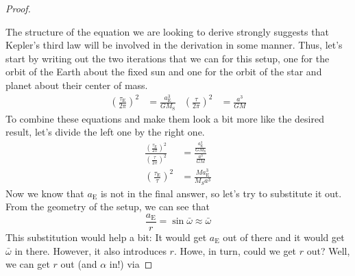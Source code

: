 \documentclass[../psets.tex]{subfiles}
\begin{document}
\begin{enumerate}
\begin{proof}
\begin{center}
        \end{center}
        The structure of the equation we are looking to derive strongly suggests that Kepler's third law will be involved in the derivation in some manner. Thus, let's start by writing out the two iterations that we can for this setup, one for the orbit of the Earth about the fixed sun and one for the orbit of the star and planet about their center of mass.
        \begin{align*}
            \left( \frac{\tau_\text{E}}{2\pi} \right)^2 &= \frac{a_\text{E}^3}{GM_\text{S}}&
            \left( \frac{\tau}{2\pi} \right)^2 &= \frac{a^3}{GM}
        \end{align*}
        To combine these equations and make them look a bit more like the desired result, let's divide the left one by the right one.
        \begin{align*}
            \frac{\left( \frac{\tau_\text{E}}{2\pi} \right)^2}{\left( \frac{\tau}{2\pi} \right)^2} &= \frac{\frac{a_\text{E}^3}{GM_\text{S}}}{\frac{a^3}{GM}}\\
            \left( \frac{\tau_\text{E}}{\tau} \right)^2 &= \frac{Ma_\text{E}^3}{M_Sa^3}
        \end{align*}
        Now we know that $a_\text{E}$ is not in the final answer, so let's try to substitute it out. From the geometry of the setup, we can see that
        \begin{equation*}
            \frac{a_\text{E}}{r} = \sin\bar{\omega}
            \approx \bar{\omega}
        \end{equation*}
        This substitution would help a bit: It would get $a_\text{E}$ out of there and it would get $\bar{\omega}$ in there. However, it also introduces $r$. Howe, in turn, could we get $r$ out? Well, we can get $r$ out (and $\alpha$ in!) via

\end{proof}
\end{enumerate}
\end{document}
